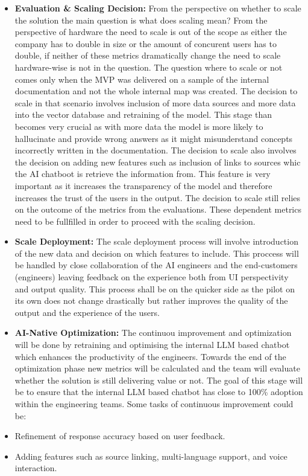 \documentclass[]{imc-inf}
\begin{document}
\begin{itemize}
	\item
	\textbf{Evaluation \& Scaling Decision:} From the perspective on
	whether to scale the solution the main question is what does scaling
	mean? From the perspective of hardware the need to scale is out of the
	scope as either the company has to double in size or the amount of
	concurent users has to double, if neither of these metrics
	dramatically change the need to scale hardware-wise is not in the
	question. The question where to scale or not comes only when the MVP
	was delivered on a sample of the internal documentation and not the
	whole internal map was created. The decision to scale in that scenario
	involves inclusion of more data sources and more data into the vector
	database and retraining of the model. This stage than becomes very
	crucial as with more data the model is more likely to hallucinate and
	provide wrong answers as it might misunderstand concepts incorrectly
	written in the documentation. The decision to scale also involves the
	decision on adding new features such as inclusion of links to sources
	whic the AI chatboot is retrieve the information from. This feature is
	very important as it increases the transparency of the model and
	therefore increases the trust of the users in the output. The decision
	to scale still relies on the outcome of the metrics from the
	evaluations. These dependent metrics need to be fullfilled in order to
	proceed with the scaling decision.
	\item
	\textbf{Scale Deployment:} The scale deployment process will involve
	introduction of the new data and decision on which features to
	include. This proccess will be handled by close collaboration of the
	AI engineers and the end-customers (engineers) leaving feedback on the
	experience both from UI perspectivity and output quality. This process
	shall be on the quicker side as the pilot on its own does not change
	drastically but rather improves the quality of the output and the
	experience of the users.
	\item
	\textbf{AI-Native Optimization:} The continuou improvement and
	optimization will be done by retraining and optimising the internal
	LLM based chatbot which enhances the productivity of the engineers.
	Towards the end of the optimization phase new metrics will be
	calculated and the team will evaluate whether the solution is still
	delivering value or not. The goal of this stage will be to ensure that
	the internal LLM based chatbot has close to 100\% adoption within the
	engineering teams. Some tasks of continuous improvement could be:
	\item
	Refinement of response accuracy based on user feedback.
	\item
	Adding features such as source linking, multi-language support, and
	voice interaction.
\end{itemize}
\end{document}
